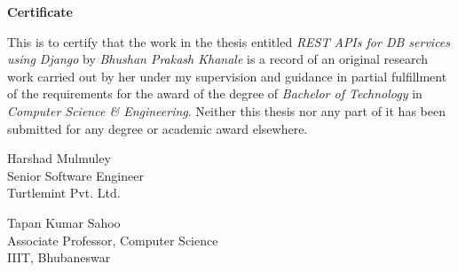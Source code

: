 \centerline{\Large{\bf Certificate}}
\vspace{1cm}

\noindent This is to certify that the work in the thesis entitled
{\it REST APIs for DB services using Django } by {\it Bhushan Prakash Khanale}
is a record of an original research work carried out by her under my
supervision and guidance in partial fulfillment of the requirements for
the award of the degree of \textit{Bachelor of Technology} in
\textit{Computer Science \& Engineering}. Neither this thesis nor any part of
it has been submitted for any degree or academic award elsewhere.

\vspace*{0.5in}
\begin{flushright}
Harshad Mulmuley\\
Senior Software Engineer\\
Turtlemint Pvt. Ltd.
\end{flushright}
\vspace*{0.5in}
\begin{flushright} 
Tapan Kumar Sahoo\\
Associate Professor, Computer Science\\
IIIT, Bhubaneswar
\end{flushright}
